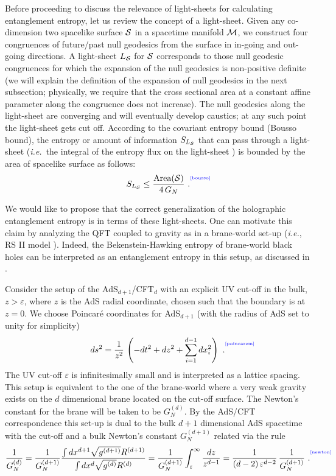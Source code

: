 \documentclass[12pt]{article}
\newcommand{\be}{\begin{equation}}
\newcommand{\ee}{\end{equation}}
\def\({\left (}
\def\){\right )}
\def\ie{{\it i.e.}}
\def\veps{\varepsilon}
\def\f#1#2{{\frac{#1}{#2}}}
\def\f#1#2{{\frac{#1}{#2}}}
\def\Label#1{\label{#1}%
{ \color{blue}{\smash{\hbox to0pt{\raise2ex\hbox{\tiny[#1]}\hss}}}}}
\def\bulk{{\cal M}}
\def\cof{{\veps}}
\def\f {\frac}
\begin{document}
Before proceeding to discuss the relevance of light-sheets for
calculating entanglement entropy, let us review the concept of a
light-sheet. Given any co-dimension two spacelike surface ${\cal
S}$ in a spacetime manifold $\bulk$, we construct four congruences of
future/past null geodesics from
 the surface in in-going and out-going directions.  A light-sheet
 $L_{{\cal S}}$ for ${\cal S}$ corresponds to those null geodesic
  congruences for which the expansion of the null geodesics is
  non-positive definite (we will explain the definition of the expansion of
  null geodesics in the next subsection; physically, we require that
  the cross sectional area at a constant affine parameter
   along the congruence does not increase).  The null geodesics along the
  light-sheet are converging and will
   eventually develop caustics; at any such point the light-sheet gets cut  off.  According to the
    covariant entropy bound (Bousso bound), the entropy or amount of information
    $S_{L_{{\cal S}}}$ that can pass through
    a light-sheet (\ie\ the integral of the entropy flux on the
    light-sheet \cite{Flanagan:1999jp})
    is bounded by the area of spacelike surface as
    follows:
%
\be
S_{L_{{\cal S}}}\leq \f{\mbox{Area}({\cal S})}{4\, G_N} \ .
\Label{bousso}
\ee
%

We would like to propose that the correct generalization of the
holographic entanglement  entropy is in terms of these light-sheets. One can motivate this claim by analyzing the  QFT coupled to gravity as in a brane-world set-up (\ie, RS II model \cite{Randall:1999vf}). Indeed, the Bekenstein-Hawking entropy of brane-world black holes can be interpreted as an entanglement entropy in this setup, as discussed in \cite{Emparan:2006ni, Hawking:2000da}.

 Consider the setup of the AdS$_{d+1}$/CFT$_{d}$ with an explicit UV cut-off in the bulk, $z>\cof$, where $z$ is the AdS radial coordinate, chosen such that the boundary is at  $z=0$. We choose Poincar\'e coordinates for AdS$_{d+1}$ (with the radius of AdS set to unity for simplicity)
%
\be ds^2=\f{1}{z^2}\, \(-dt^2+dz^2+\sum_{i=1}^{d-1}dx_i^2\) \ .
\Label{poincarem}
\ee
%
 The UV cut-off $\cof$ is infinitesimally small and is interpreted as a lattice spacing. This setup is  equivalent to the one of the brane-world where a very weak gravity exists on the $d$ dimensional brane located on the cut-off surface. The Newton's constant for the brane will be taken to be $G^{(d)}_N$. By the AdS/CFT
correspondence this set-up is dual to the bulk $d+1$ dimensional AdS
spacetime with the cut-off and a bulk Newton's constant
$G^{(d+1)}_N$ related via the rule
%
\begin{equation}
\f{1}{G^{(d)}_N}=\f{1}{G^{(d+1)}_N}\f{\int
dx^{d+1}\sqrt{g^{(d+1)}}R^{(d+1)}}{\int
dx^{d}\sqrt{g^{(d)}}R^{(d)}}= \f{1}{G^{(d+1)}_N}\int^{\infty}_{\cof}
\f{dz}{z^{d-1}} =\f{1}{(d-2) \,
 \cof^{d-2}}\,  \f{1}{G^{(d+1)}_N}\ .
\Label{newton}
\end{equation}
%
\end{document}

